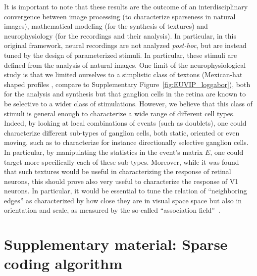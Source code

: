 \documentclass[a4paper, 10pt, twocolumns]{article}
\begin{document}
It is important to note that these results are the outcome of an interdisciplinary convergence between image processing (to characterize sparseness in natural images), mathematical modeling (for the synthesis of textures) and neurophysiology (for the recordings and their analysis). In particular, in this original framework, neural recordings are not analyzed \emph{post-hoc}, but are instead tuned by the design of parameterized stimuli. In particular, these stimuli are defined from the analysis of natural images. One limit of the neurophysiological study is that we limited ourselves to a simplistic class of textons (Mexican-hat shaped profiles\if{} , compare to Supplementary Figure~\ref{fig:EUVIP_loggabor}\fi), both for the analysis and synthesis but that ganglion cells in the retina are known to be selective to a wider class of stimulations. However, we believe that this class of stimuli is general enough to characterize a wide range of different cell types. Indeed, by looking at local combinations of events (such as doublets), one could characterize different sub-types of ganglion cells, both static, oriented or even moving, such as to characterize for instance directionally selective ganglion cells. In particular, by manipulating the statistics in the event's matrix $E$, one could target more specifically each of these sub-types. Moreover, while it  was found that such textures would be useful in characterizing the response of retinal neurons, this should prove also very useful to characterize the response of V1 neurons. In particular, it would be essential to tune the relation of ``neighboring edges'' as characterized by how close they are in visual space space but also in orientation and scale, as measured by the so-called ``association field''~\citep{PerrinetBednar15}.

\if{}
\newpage
\section{Supplementary material: Sparse coding algorithm}
\label{sec:sparse} %
\end{document}
